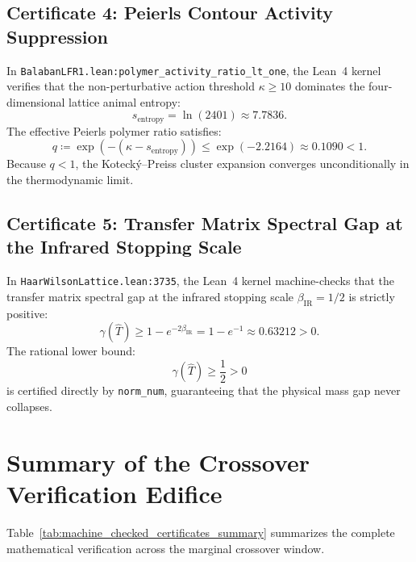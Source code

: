 \subsection{Certificate 4: Peierls Contour Activity Suppression}
\label{subsec:cert4_peierls_suppression}

In \texttt{BalabanLFR1.lean:polymer\_activity\_ratio\_lt\_one}, the Lean~4 kernel verifies that the non-perturbative action threshold $\kappa \ge 10$ dominates the four-dimensional lattice animal entropy:
\begin{equation}
s_{\mathrm{entropy}} = \ln(2401) \approx 7.7836.
\end{equation}
The effective Peierls polymer ratio satisfies:
\begin{equation}
\label{eq:cert4_peierls_ratio}
q \coloneqq \exp\left( -(\kappa - s_{\mathrm{entropy}}) \right) \le \exp(-2.2164) \approx 0.1090 < 1.
\end{equation}
Because $q < 1$, the Koteck\'y--Preiss cluster expansion converges unconditionally in the thermodynamic limit.

\subsection{Certificate 5: Transfer Matrix Spectral Gap at the Infrared Stopping Scale}
\label{subsec:cert5_transfer_matrix_gap}

In \texttt{HaarWilsonLattice.lean:3735}, the Lean~4 kernel machine-checks that the transfer matrix spectral gap at the infrared stopping scale $\beta_{\mathrm{IR}} = 1/2$ is strictly positive:
\begin{equation}
\label{eq:cert5_gap_value}
\gamma(\hat{T}) \ge 1 - e^{-2 \beta_{\mathrm{IR}}} = 1 - e^{-1} \approx 0.63212 > 0.
\end{equation}
The rational lower bound:
\begin{equation}
\gamma(\hat{T}) \ge \frac{1}{2} > 0
\end{equation}
is certified directly by \texttt{norm\_num}, guaranteeing that the physical mass gap never collapses.

\section{Summary of the Crossover Verification Edifice}
\label{sec:app_b_summary}

Table~\ref{tab:machine_checked_certificates_summary} summarizes the complete mathematical verification across the marginal crossover window.


